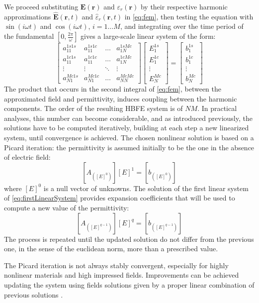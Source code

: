 \documentclass[journal]{IEEEtran}
\renewcommand{\vec}[1]{\mathbf{#1}}
\begin{document}
\par We proceed substituting $\vec{E}(\vec{r})$ and ${\varepsilon}_r(\vec{r})$ by their respective harmonic approximations $\vec{\hat{E}}(\vec{r}, t)$ and $\hat{{\varepsilon}}_r(\vec{r}, t)$ in \eqref{eq:fem}, then testing the equation with $\sin(i \omega t)$ and $\cos(i \omega t)$, $i = 1 \dots M$, and integrating over the time period of the fundamental $\left [ 0,\frac{2\pi}{\omega} \right ]$ gives a large-scale linear system of the form:
\begin{equation}
\scriptscriptstyle
\left[ \begin{array}{cccc}
a_{11}^{1s1s} & a_{11}^{1s1c} & \ldots &  a_{1N}^{1sMc} \\
a_{11}^{1c1s} & a_{11}^{1c1c} & \ldots &  a_{1N}^{1cMc} \\
\vdots & \vdots & \ddots & \vdots \\
a_{N1}^{Mc1s} & a_{N1}^{Mc1c} & \ldots &  a_{NN}^{McMc}
\end{array}\right] 
\left[ \begin{array}{cccc}
E_{1}^{1s} \\
E_{1}^{1c} \\
\vdots \\
E_{N}^{Mc}
\end{array}\right] =
\left[ \begin{array}{cccc}
b_{1}^{1s} \\
b_{1}^{1c} \\
\vdots \\
b_{N}^{Mc}
\end{array}\right] 
\end{equation}
The product that occurs in the second integral of \ref{eq:fem}, between the approximated field and permittivity, induces coupling between the harmonic components. The order of the resulting HBFE system is of $N M$. In practical analyses, this number can become considerable, and as introduced previously, the solutions have to be computed iteratively, building at each step a new linearized system, until convergence is achieved. The chosen nonlinear solution is based on a Picard iteration: the permittivity is assumed initially to be the one in the absence of electric field: 
\begin{equation} \label{eq:firstLinearSystem}
[A_{([E]^0)}] [E]^1 = [b_{([E]^0)}]
\end{equation} where $[E]^0$ is a null vector of unknowns. The solution of the first linear system of \eqref{eq:firstLinearSystem} provides expansion coefficients that will be used to compute a new value of the permittivity:
\begin{equation} \label{eq:firstLinearSystem}
[A_{([E]^{q-1})}] [E]^{q} = [b_{([E]^{q-1})}]
\end{equation}
 The process is repeated until the updated solution do not differ from the previous one, in the sense of the euclidean norm, more than a prescribed value.
\par The Picard iteration is not always stably convergent, especially for highly nonlinear materials and high impressed fields. Improvements can be achieved updating the system using fields solutions given by a proper linear combination of previous solutions \cite{Silvester1997}.
\end{document}
